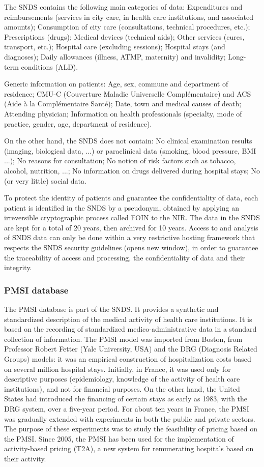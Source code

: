 The SNDS contains the following main categories of data:
Expenditures and reimbursements (services in city care, in health care institutions, and associated amounts);
Consumption of city care (consultations, technical procedures, etc.);
Prescriptions (drugs);
Medical devices (technical aids);
Other services (cures, transport, etc.);
Hospital care (excluding sessions);
Hospital stays (and diagnoses);
Daily allowances (illness, ATMP, maternity) and invalidity;
Long-term conditions (ALD).

Generic information on patients:
Age, sex, commune and department of residence;
CMU-C (Couverture Maladie Universelle Complémentaire) and ACS (Aide à la Complémentaire Santé);
Date, town and medical causes of death;
Attending physician;
Information on health professionals (specialty, mode of practice, gender, age, department of residence).

On the other hand, the SNDS does not contain:
No clinical examination results (imaging, biological data, ...) or paraclinical data (smoking, blood pressure, BMI ...);
No reasons for consultation;
No notion of risk factors such as tobacco, alcohol, nutrition, ...;
No information on drugs delivered during hospital stays;
No (or very little) social data.

To protect the identity of patients and guarantee the confidentiality of data,
each patient is identified in the SNDS by a pseudonym, obtained by applying an
irreversible cryptographic process called FOIN to the NIR. The data in the SNDS
are kept for a total of 20 years, then archived for 10 years.
Access to and analysis of SNDS data can only be done within a very restrictive
hosting framework that respects the SNDS security guidelines (opens new window),
in order to guarantee the traceability of access and processing, the
confidentiality of data and their integrity.

\subsubsection{PMSI database}

The PMSI database is part of the SNDS. It provides a synthetic and standardized
description of the medical activity of health care institutions. It is based on
the recording of standardized medico-administrative data in a standard
collection of information. The PMSI model was imported
from Boston, from Professor Robert Fetter (Yale University, USA) and the DRG
(Diagnosis Related Groups) models: it was an empirical construction of
hospitalization costs based on several million hospital stays. Initially, in
France, it was used only for descriptive purposes (epidemiology, knowledge of
the activity of health care institutions), and not for financial purposes. On
the other hand, the United States had introduced the financing of certain stays
as early as 1983, with the DRG system, over a five-year period. For about ten
years in France, the PMSI was gradually extended with experiments in both the
public and private sectors. The purpose of these experiments was to study the
feasibility of pricing based on the PMSI. Since 2005, the PMSI has been used for
the implementation of activity-based pricing (T2A), a new system for
remunerating hospitals based on their activity.

